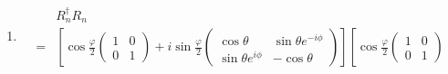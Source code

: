 \begin{enumerate}
    \begin{align*}
        \bm n\cdot \bm \sigma =& 
        \sin\theta\cos\phi\begin{pmatrix}
            0 & 1\\1 & 0
        \end{pmatrix}
        +
         \sin\theta\sin\phi\begin{pmatrix}
            0 & -i\\i & 0
        \end{pmatrix}
        +\cos\theta\begin{pmatrix}
            1 & 0 \\ 0 & -1
        \end{pmatrix}\\
        =&
        \begin{pmatrix}
            \cos\theta & \sin\theta e^{-i\phi}\\
             \sin\theta e^{i\phi}&-\cos\theta 
        \end{pmatrix}
    \end{align*}
    Thus 
    \begin{align*}
        R_{\bm n}
        =\cos\frac{\varphi}{2}
        \begin{pmatrix}
            1 & 0 \\0 & 1
        \end{pmatrix} -i\sin\frac{\varphi}{2}
        \begin{pmatrix}
            \cos\theta & \sin\theta e^{-i\phi}\\
             \sin\theta e^{i\phi}&-\cos\theta 
        \end{pmatrix}
    \end{align*}
    \item 
    \begin{align*}
        &R_n^\dagger R_n \\= & 
        \left[\cos\frac{\varphi}{2}
        \begin{pmatrix}
            1 & 0 \\0 & 1
        \end{pmatrix} +i\sin\frac{\varphi}{2}
        \begin{pmatrix}
            \cos\theta & \sin\theta e^{-i\phi}\\
             \sin\theta e^{i\phi}&-\cos\theta 
        \end{pmatrix}
        \right]
        \left[\cos\frac{\varphi}{2}
        \begin{pmatrix}
            1 & 0 \\0 & 1

\end{pmatrix}
\end{align*}
\end{enumerate}
